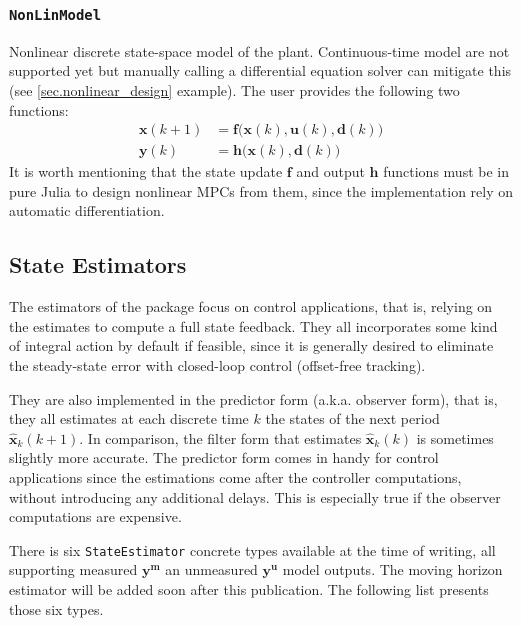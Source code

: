 \subsubsection{\textnormal{\texttt{NonLinModel}}}

Nonlinear discrete state-space model of the plant. Continuous-time model are not supported yet but manually calling a differential equation solver can mitigate this (see \cref{sec.nonlinear_design} example). The user provides the following two functions:
\begin{subequations}
\begin{align}
    \mathbf{x}(k+1) &= \mathbf{f}\big(\mathbf{x}(k), \mathbf{u}(k), \mathbf{d}(k)\big) \\
    \mathbf{y}(k)   &= \mathbf{h}\big( \mathbf{x}(k), \mathbf{d}(k) \big)
\end{align}
\end{subequations}
It is worth mentioning that the state update $\mathbf{f}$ and output $\mathbf{h}$ functions must be in pure Julia to design nonlinear MPCs from them, since the implementation rely on automatic differentiation.

\subsection{State Estimators}

The estimators of the package focus on control applications, that is, relying on the estimates to compute a full state feedback. They all incorporates some kind of integral action by default if feasible, since it is generally desired to eliminate the steady-state error with closed-loop control (offset-free tracking).

They are also implemented in the predictor form (a.k.a. observer form), that is, they all estimates at each discrete time $k$ the states of the next period $\mathbf{\hat{x}}_k(k+1)$. In comparison, the filter form that estimates $\mathbf{\hat{x}}_k(k)$ is sometimes slightly more accurate. The predictor form comes in handy for control applications since the estimations come after the controller computations, without introducing any additional delays. This is especially true if the observer computations are expensive.

There is six \texttt{StateEstimator} concrete types available at the time of writing, all supporting measured $\mathbf{y^m}$ an unmeasured $\mathbf{y^u}$ model outputs. The moving horizon estimator will be added soon after this publication. The following list presents those six types.

